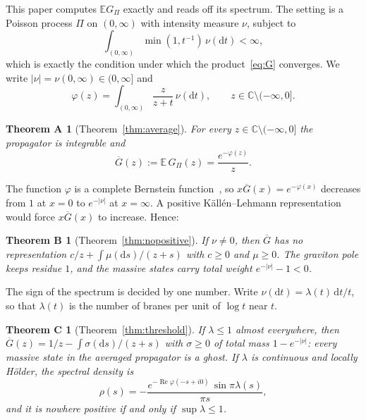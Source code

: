 \documentclass[aps,prd,twocolumn,superscriptaddress,nofootinbib,longbibliography,floatfix,amsmath,amssymb,10pt]{revtex4-2}
\newtheorem*{theoremA}{Theorem A}
\newtheorem*{theoremB}{Theorem B}
\newtheorem*{theoremC}{Theorem C}
\theoremstyle{definition}
\theoremstyle{remark}
\newcommand{\C}{\mathbb{C}}
\newcommand{\E}{\mathbb{E}}
\newcommand{\Gbar}{\overline{G}}
\newcommand{\dd}{\mathrm{d}}
\newcommand{\cut}{\C\setminus(-\infty,0]}
\DeclareMathOperator{\re}{Re}
\begin{document}
This paper computes $\E G_\Pi$ exactly and reads off its spectrum. The setting
is a Poisson process $\Pi$ on $(0,\infty)$ with intensity measure $\nu$,
subject to
\begin{equation}\label{eq:H}
\int_{(0,\infty)}\min(1,t^{-1})\,\nu(\dd t)<\infty,\tag{H}
\end{equation}
which is exactly the condition under which the product~\eqref{eq:G}
converges. We write $|\nu|=\nu(0,\infty)\in(0,\infty]$ and
\begin{equation}\label{eq:phi}
\varphi(z)=\int_{(0,\infty)}\frac{z}{z+t}\,\nu(\dd t),\qquad z\in\cut .
\end{equation}

\begin{theoremA}[Theorem~\ref{thm:average}]
For every $z\in\cut$ the propagator is integrable and
\begin{equation}\label{eq:main}
\Gbar(z):=\E\,G_\Pi(z)=\frac{e^{-\varphi(z)}}{z}.
\end{equation}
\end{theoremA}

The function $\varphi$ is a complete Bernstein function~\cite{SSV2012}, so
$x\Gbar(x)=e^{-\varphi(x)}$ decreases from $1$ at $x=0$ to $e^{-|\nu|}$ at
$x=\infty$. A positive K\"all\'en--Lehmann
representation~\cite{Kallen1952,Lehmann1954} would force $x\Gbar(x)$ to
increase. Hence:

\begin{theoremB}[Theorem~\ref{thm:nopositive}]
If $\nu\neq0$, then $\Gbar$ has no representation $c/z+\int\mu(\dd
s)/(z+s)$ with $c\ge0$ and $\mu\ge0$. The graviton pole keeps residue $1$, and
the massive states carry total weight $e^{-|\nu|}-1<0$.
\end{theoremB}

The sign of the spectrum is decided by one number. Write
$\nu(\dd t)=\lambda(t)\,\dd t/t$, so that $\lambda(t)$ is the number of
branes per unit of $\log t$ near $t$.

\begin{theoremC}[Theorem~\ref{thm:threshold}]
If $\lambda\le1$ almost everywhere, then
$\Gbar(z)=1/z-\int\sigma(\dd s)/(z+s)$ with $\sigma\ge0$ of total mass
$1-e^{-|\nu|}$: every massive state in the averaged propagator is a ghost. If
$\lambda$ is continuous and locally H\"older, the spectral density is
\begin{equation}\label{eq:rho}
\rho(s)=-\frac{e^{-\re\varphi(-s+i0)}\,\sin\pi\lambda(s)}{\pi s},
\end{equation}
and it is nowhere positive if and only if $\sup\lambda\le1$.
\end{theoremC}
\end{document}
